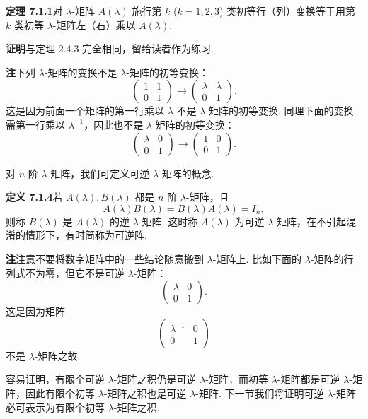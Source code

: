 \documentclass[UTF8,12pt,a4paper,fontset=fandol]{ctexart}
\begin{document}
\noindent\textbf{定理 7.1.1}\quad 对 $\lambda$-矩阵 $A(\lambda)$ 施行第 $k$ ($k=1,2,3$) 类初等行（列）变换等于用第 $k$ 类初等 $\lambda$-矩阵左（右）乘以 $A(\lambda)$.

\noindent\textbf{证明}\quad 与定理 2.4.3 完全相同，留给读者作为练习.

\noindent\textbf{注}\quad 下列 $\lambda$-矩阵的变换不是 $\lambda$-矩阵的初等变换：
\[
\left(\begin{array}{cc}
1 & 1\\
0 & 1
\end{array}\right)\to
\left(\begin{array}{cc}
\lambda & \lambda\\
0 & 1
\end{array}\right).
\]
这是因为前面一个矩阵的第一行乘以 $\lambda$ 不是 $\lambda$-矩阵的初等变换. 同理下面的变换需第一行乘以 $\lambda^{-1}$，因此也不是 $\lambda$-矩阵的初等变换：
\[
\left(\begin{array}{cc}
\lambda & 0\\
0 & 1
\end{array}\right)\to
\left(\begin{array}{cc}
1 & 0\\
0 & 1
\end{array}\right).
\]

对 $n$ 阶 $\lambda$-矩阵，我们可定义可逆 $\lambda$-矩阵的概念.

\noindent\textbf{定义 7.1.4}\quad 若 $A(\lambda),B(\lambda)$ 都是 $n$ 阶 $\lambda$-矩阵，且
\[
A(\lambda)B(\lambda)=B(\lambda)A(\lambda)=I_n,
\]
则称 $B(\lambda)$ 是 $A(\lambda)$ 的逆 $\lambda$-矩阵. 这时称 $A(\lambda)$ 为可逆 $\lambda$-矩阵，在不引起混淆的情形下，有时简称为可逆阵.

\noindent\textbf{注}\quad 注意不要将数字矩阵中的一些结论随意搬到 $\lambda$-矩阵上. 比如下面的 $\lambda$-矩阵的行列式不为零，但它不是可逆 $\lambda$-矩阵：
\[
\left(\begin{array}{cc}
\lambda & 0\\
0 & 1
\end{array}\right).
\]
这是因为矩阵
\[
\left(\begin{array}{cc}
\lambda^{-1} & 0\\
0 & 1
\end{array}\right)
\]
不是 $\lambda$-矩阵之故.

容易证明，有限个可逆 $\lambda$-矩阵之积仍是可逆 $\lambda$-矩阵，而初等 $\lambda$-矩阵都是可逆 $\lambda$-矩阵，因此有限个初等 $\lambda$-矩阵之积也是可逆 $\lambda$-矩阵. 下一节我们将证明可逆 $\lambda$-矩阵必可表示为有限个初等 $\lambda$-矩阵之积.
\end{document}

